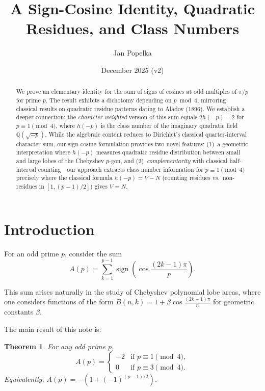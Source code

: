 \documentclass[11pt,a4paper]{article}
\title{A Sign-Cosine Identity, Quadratic Residues, and Class Numbers}
\author{Jan Popelka}
\date{December 2025 (v2)}
\newtheorem{theorem}{Theorem}
\begin{document}
\maketitle

\begin{abstract}
We prove an elementary identity for the sum of signs of cosines at odd multiples of $\pi/p$ for prime $p$. The result exhibits a dichotomy depending on $p \bmod 4$, mirroring classical results on quadratic residue patterns dating to Aladov (1896). We establish a deeper connection: the \emph{character-weighted} version of this sum equals $2h(-p) - 2$ for $p \equiv 1 \pmod 4$, where $h(-p)$ is the class number of the imaginary quadratic field $\mathbb{Q}(\sqrt{-p})$. While the algebraic content reduces to Dirichlet's classical quarter-interval character sum, our sign-cosine formulation provides two novel features: (1)~a geometric interpretation where $h(-p)$ measures quadratic residue distribution between small and large lobes of the Chebyshev $p$-gon, and (2)~\emph{complementarity} with classical half-interval counting---our approach extracts class number information for $p \equiv 1 \pmod 4$ precisely where the classical formula $h(-p) = V - N$ (counting residues vs.\ non-residues in $[1, (p-1)/2]$) gives $V = N$.
\end{abstract}

\section{Introduction}

For an odd prime $p$, consider the sum
\begin{equation}\label{eq:Ap}
A(p) = \sum_{k=1}^{p-1} \operatorname{sign}\left(\cos\frac{(2k-1)\pi}{p}\right).
\end{equation}

This sum arises naturally in the study of Chebyshev polynomial lobe areas, where one considers functions of the form $B(n,k) = 1 + \beta\cos\frac{(2k-1)\pi}{n}$ for geometric constants $\beta$.

The main result of this note is:

\begin{theorem}\label{thm:main}
For any odd prime $p$,
\[
A(p) = \begin{cases}
-2 & \text{if } p \equiv 1 \pmod{4}, \\
0 & \text{if } p \equiv 3 \pmod{4}.
\end{cases}
\]
Equivalently, $A(p) = -(1 + (-1)^{(p-1)/2})$.
\end{theorem}
\end{document}

